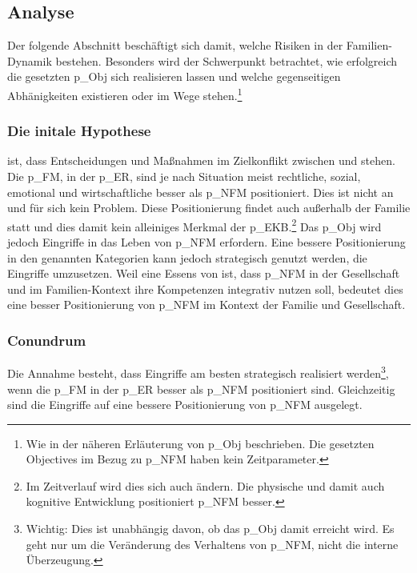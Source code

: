 \subsection{Analyse} \label{sec:Risiko_EKB}
Der folgende Abschnitt beschäftigt sich damit, welche Risiken in der Familien-Dynamik bestehen. Besonders wird der Schwerpunkt betrachtet, wie erfolgreich die gesetzten \gls{p_Obj} sich realisieren lassen und welche gegenseitigen Abhänigkeiten existieren oder im Wege stehen.\footnote{
	Wie in der näheren Erläuterung von \gls{p_Obj} beschrieben. Die gesetzten Objectives im Bezug zu \gls{p_NFM} haben kein Zeitparameter.
}

\subsubsection{Die initale Hypothese} ist, dass Entscheidungen und Maßnahmen im Zielkonflikt zwischen  und  stehen.\\

Die \gls{p_FM}, in der \gls{p_ER}, sind je nach Situation meist rechtliche, sozial, emotional und wirtschaftliche besser als \gls{p_NFM} positioniert. Dies ist nicht an und für sich kein Problem. Diese Positionierung findet auch außerhalb der Familie statt und dies damit kein alleiniges Merkmal der \gls{p_EKB}.\footnote{
	Im Zeitverlauf wird dies sich auch ändern. Die physische und damit auch kognitive Entwicklung positioniert \gls{p_NFM} besser.
}
Das \gls{p_Obj}  wird jedoch Eingriffe in das Leben von \gls{p_NFM} erfordern. Eine bessere Positionierung in den genannten Kategorien kann jedoch strategisch genutzt werden, die Eingriffe umzusetzen. Weil eine Essens von  ist, dass
\gls{p_NFM} in der Gesellschaft und im Familien-Kontext ihre Kompetenzen integrativ nutzen soll, bedeutet dies eine besser Positionierung von \gls{p_NFM} im Kontext der Familie und Gesellschaft.\\ 

\subsubsection{Conundrum} Die Annahme besteht, dass Eingriffe am besten strategisch realisiert werden\footnote{
	Wichtig: Dies ist unabhängig davon, ob das \gls{p_Obj} damit erreicht wird. Es geht nur um die Veränderung des Verhaltens von \gls{p_NFM}, nicht die interne Überzeugung.
}, wenn die \gls{p_FM} in der \gls{p_ER} besser als \gls{p_NFM} positioniert sind. Gleichzeitig sind die Eingriffe auf eine bessere Positionierung von \gls{p_NFM} ausgelegt.\\

